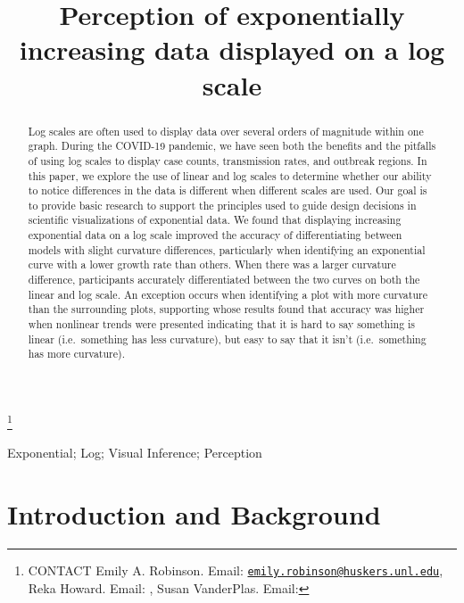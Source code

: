 \documentclass[]{interact}
\theoremstyle{plain}%
\theoremstyle{definition}
\theoremstyle{remark}
\begin{document}

\title{Perception of exponentially increasing data displayed on a log scale}


\author{
}

\thanks{CONTACT Emily A. Robinson. Email: \href{mailto:emily.robinson@huskers.unl.edu}{\nolinkurl{emily.robinson@huskers.unl.edu}}, Reka Howard. Email: , Susan VanderPlas. Email: }

\maketitle

\begin{abstract}
Log scales are often used to display data over several orders of
magnitude within one graph. During the COVID-19 pandemic, we have seen
both the benefits and the pitfalls of using log scales to display case
counts, transmission rates, and outbreak regions. In this paper, we
explore the use of linear and log scales to determine whether our
ability to notice differences in the data is different when different
scales are used. Our goal is to provide basic research to support the
principles used to guide design decisions in scientific visualizations
of exponential data. We found that displaying increasing exponential
data on a log scale improved the accuracy of differentiating between
models with slight curvature differences, particularly when identifying
an exponential curve with a lower growth rate than others. When there
was a larger curvature difference, participants accurately
differentiated between the two curves on both the linear and log scale.
An exception occurs when identifying a plot with more curvature than the
surrounding plots, supporting \cite{best_perception_2007} whose results
found that accuracy was higher when nonlinear trends were presented
indicating that it is hard to say something is linear (i.e.~something
has less curvature), but easy to say that it isn't (i.e.~something has
more curvature).
\end{abstract}

\begin{keywords}
Exponential; Log; Visual Inference; Perception
\end{keywords}

\hypertarget{introduction-and-background}{%
\section{Introduction and
Background}\label{introduction-and-background}}
\end{document}
